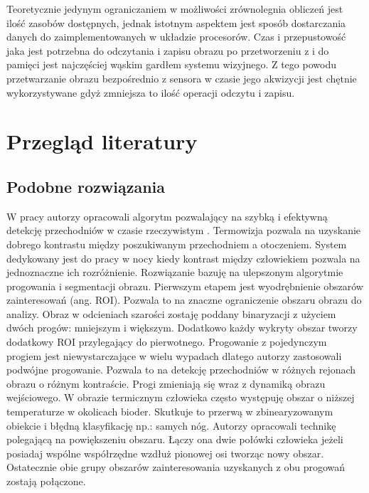 Teoretycznie jedynym ograniczaniem w możliwości zrównolegnia obliczeń jest ilość zasobów dostępnych, jednak istotnym aspektem jest sposób dostarczania danych do zaimplementowanych w układzie procesorów. Czas i przepustowość jaka jest potrzebna do odczytania i zapisu obrazu po przetworzeniu z i do pamięci jest najczęściej wąskim gardłem systemu wizyjnego. Z tego powodu przetwarzanie obrazu bezpośrednio z sensora w czasie jego akwizycji jest chętnie wykorzystywane gdyż zmniejsza to ilość operacji odczytu i zapisu.  \cite{garcia2014survey}

\section{Przegląd literatury}

\subsection{Podobne rozwiązania}

W pracy \cite{kolzpoz} autorzy opracowali algorytm pozwalający na szybką i efektywną detekcję przechodniów w czasie rzeczywistym . Termowizja pozwala na uzyskanie dobrego kontrastu między poszukiwanym przechodniem a otoczeniem. System dedykowany jest do pracy w nocy kiedy kontrast między człowiekiem pozwala na jednoznaczne ich rozróżnienie. Rozwiązanie bazuję na ulepszonym algorytmie progowania i segmentacji obrazu. Pierwszym etapem jest wyodrębnienie obszarów zainteresowań (ang. ROI). Pozwala to na znaczne ograniczenie obszaru obrazu do analizy. Obraz w odcieniach szarości zostaję poddany binaryzacji z użyciem dwóch progów: mniejszym i większym. Dodatkowo każdy wykryty obszar tworzy dodatkowy ROI przylegający do pierwotnego. Progowanie z pojedynczym progiem jest niewystarczające w wielu wypadach dlatego autorzy zastosowali podwójne progowanie. Pozwala to na detekcję przechodniów w różnych rejonach obrazu o różnym kontraście. Progi zmieniają się wraz z dynamiką obrazu wejściowego. W obrazie termicznym człowieka często występuję obszar o niższej temperaturze w okolicach bioder. Skutkuje to przerwą w zbinearyzowanym obiekcie i błędną klasyfikację np.: samych nóg. Autorzy opracowali technikę polegającą na powiększeniu obszaru. Łączy ona dwie połówki człowieka jeżeli posiadaj wspólne współrzędne wzdłuż pionowej osi tworząc nowy obszar. Ostatecznie obie grupy obszarów zainteresowania uzyskanych z obu progowań zostają połączone. 

